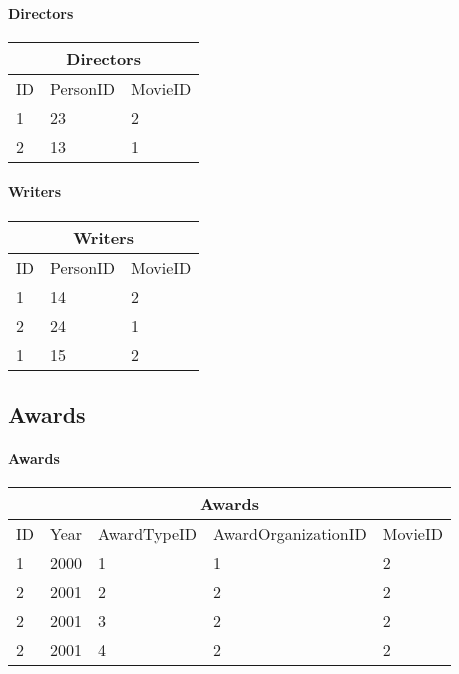 \paragraph{Directors}

\begin{center}
\begin{tabular}{|l|l|l|}
\hline
\multicolumn{3}{|c|}{Directors} \\ \hline
ID & PersonID & MovieID \\ \hline
1 & 23 & 2 \\ \hline
2 & 13 & 1 \\ \hline
\end{tabular}
\end{center}

\paragraph{Writers}

\begin{center}
\begin{tabular}{|l|l|l|}
\hline
\multicolumn{3}{|c|}{Writers} \\ \hline
ID & PersonID & MovieID\\ \hline
1 & 14 & 2 \\ \hline
2 & 24 & 1 \\ \hline
1 & 15 & 2 \\ \hline
\end{tabular}
\end{center}

\subsection{Awards}

\paragraph{Awards}
\begin{center}
\begin{tabular}{|l|l|l|l|l|}
\hline
\multicolumn{5}{|c|}{Awards} \\ \hline
ID & Year & AwardTypeID & AwardOrganizationID & MovieID \\ \hline \hline
1 & 2000 & 1 & 1 & 2 \\ \hline
2 & 2001 & 2 & 2 & 2 \\ \hline
2 & 2001 & 3 & 2 & 2 \\ \hline
2 & 2001 & 4 & 2 & 2 \\ \hline
\end{tabular}
\end{center}

